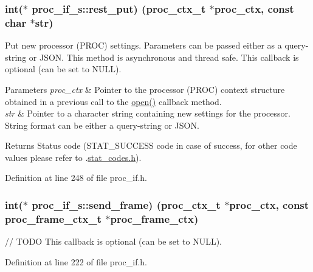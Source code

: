 \subsubsection[{\texorpdfstring{rest\+\_\+put}{rest_put}}]{\setlength{\rightskip}{0pt plus 5cm}int($\ast$ proc\+\_\+if\+\_\+s\+::rest\+\_\+put) ({\bf proc\+\_\+ctx\+\_\+t} $\ast$proc\+\_\+ctx, const char $\ast$str)}\hypertarget{structproc__if__s_acb4d2c240c52904ebd6904f54b1a9b78}{}\label{structproc__if__s_acb4d2c240c52904ebd6904f54b1a9b78}
Put new processor (P\+R\+OC) settings. Parameters can be passed either as a query-\/string or J\+S\+ON. This method is asynchronous and thread safe. This callback is optional (can be set to N\+U\+LL). 
\begin{DoxyParams}{Parameters}
{\em proc\+\_\+ctx} & Pointer to the processor (P\+R\+OC) context structure obtained in a previous call to the \textquotesingle{}\hyperlink{structproc__if__s_a34999576771394dfb721463c8455ba06}{open()}\textquotesingle{} callback method. \\
\hline
{\em str} & Pointer to a character string containing new settings for the processor. String format can be either a query-\/string or J\+S\+ON. \\
\hline
\end{DoxyParams}
\begin{DoxyReturn}{Returns}
Status code (S\+T\+A\+T\+\_\+\+S\+U\+C\+C\+E\+SS code in case of success, for other code values please refer to .\hyperlink{stat__codes_8h}{stat\+\_\+codes.\+h}). 
\end{DoxyReturn}


Definition at line 248 of file proc\+\_\+if.\+h.

\subsubsection[{\texorpdfstring{send\+\_\+frame}{send_frame}}]{\setlength{\rightskip}{0pt plus 5cm}int($\ast$ proc\+\_\+if\+\_\+s\+::send\+\_\+frame) ({\bf proc\+\_\+ctx\+\_\+t} $\ast$proc\+\_\+ctx, const {\bf proc\+\_\+frame\+\_\+ctx\+\_\+t} $\ast$proc\+\_\+frame\+\_\+ctx)}\hypertarget{structproc__if__s_a0393cc5e598e19951d447a926c364e3f}{}\label{structproc__if__s_a0393cc5e598e19951d447a926c364e3f}
// T\+O\+DO This callback is optional (can be set to N\+U\+LL). 

Definition at line 222 of file proc\+\_\+if.\+h.

